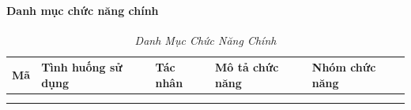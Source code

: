 \documentclass{article}
\begin{document}
\paragraph{Danh mục chức năng chính}
\begin{longtable}{|
  >{\raggedright\arraybackslash}p{}|
  >{\raggedright\arraybackslash}p{}|
  >{\raggedright\arraybackslash}p{}|
  >{\raggedright\arraybackslash}p{}|
  >{\raggedright\arraybackslash}p{}|}
  \hline
  \textbf{Mã} & \textbf{Tình huống sử dụng} & \textbf{Tác nhân} & \textbf{Mô tả chức năng} & \textbf{Nhóm chức năng} \\
  \hline
  \endfirsthead

  \endhead

  \hline
  \endfoot

  \hline
  \caption{\centering\textit{Danh Mục Chức Năng Chính}}
  \label{tab:functional-catalog} \\
  \endlastfoot


\end{longtable}
\end{document}
